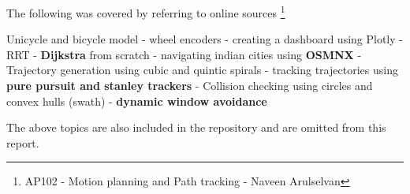 The following was covered by referring to online sources \footnote{AP102 - Motion planning and Path tracking - Naveen Arulselvan}

\begin{displayquote}
    Unicycle and bicycle model - wheel encoders - creating a dashboard using Plotly - RRT - \textbf{ Dijkstra} from scratch - navigating indian cities using \textbf{OSMNX} - Trajectory generation using cubic and quintic spirals - tracking trajectories using \textbf{pure pursuit and stanley trackers} - Collision checking using circles and convex hulls (swath) - \textbf{dynamic window avoidance}
\end{displayquote}

The above topics are also included in the repository and are omitted from this report.
